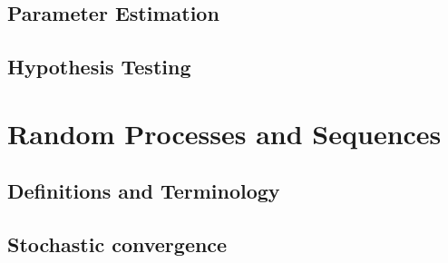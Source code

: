 \documentclass{amro-notes}
\begin{document}
\chapter{Parameter Estimation}


\chapter{Hypothesis Testing}


\part{Random Processes and Sequences}
\chapter{Definitions and Terminology}


\chapter{Stochastic convergence}


\begin{appendices}
    
\end{appendices}





\end{document}
